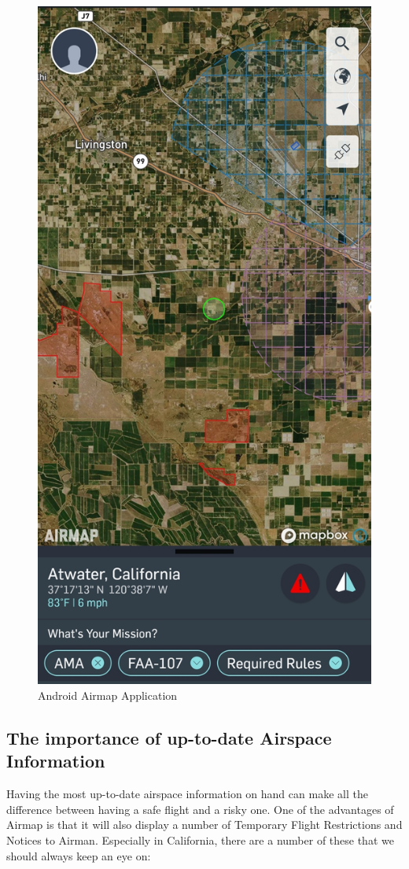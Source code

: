 \documentclass[
]{book}
\begin{document}
\begin{figure}

{\centering \includegraphics[width=0.5\linewidth]{images/Airmap-Android} 

}

\caption{Android Airmap Application}\label{fig:airmap}
\end{figure}

\hypertarget{the-importance-of-up-to-date-airspace-information}{%
\subsection{The importance of up-to-date Airspace Information}\label{the-importance-of-up-to-date-airspace-information}}

Having the most up-to-date airspace information on hand can make all the difference between having a safe flight and a risky one. One of the advantages of Airmap is that it will also display a number of Temporary Flight Restrictions and Notices to Airman. Especially in California, there are a number of these that we should always keep an eye on:
\end{document}
